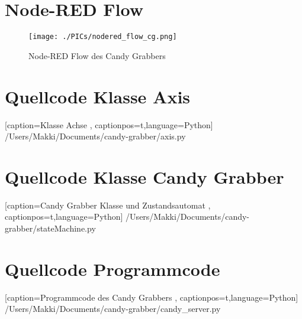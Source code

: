 \documentclass[BMR,Bachelor,ngerman]{twbook}%
\begin{document}
\chapter{Node-RED Flow}
\begin{figure}[H]
\centering
\texttt{[image: ./PICs/nodered\_flow\_cg.png]}
\caption{Node-RED Flow des Candy Grabbers}\label{fig:nodered_flow}
\end{figure}
%
\chapter{Quellcode Klasse Axis}
 
    [caption={Klasse Achse}
       \label{lst:axis},
       captionpos=t,language=Python]
 {/Users/Makki/Documents/candy-grabber/axis.py}
%
\chapter{Quellcode Klasse Candy Grabber}
 
    [caption={Candy Grabber Klasse und Zustandsautomat}
       \label{lst:stateMachine},
       captionpos=t,language=Python]
 {/Users/Makki/Documents/candy-grabber/stateMachine.py}
%
\clearpage
\chapter{Quellcode Programmcode}
 
    [caption={Programmcode des Candy Grabbers}
       \label{lst:candy_server},
       captionpos=t,language=Python]
 {/Users/Makki/Documents/candy-grabber/candy_server.py}
\end{document}
